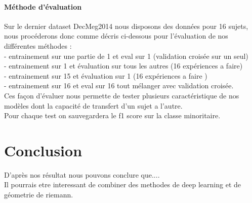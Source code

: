 \documentclass{article}
\begin{document}
\subsection{Méthode d'évaluation}
Sur le dernier dataset DecMeg2014 nous disposons des données pour 16 sujets, nous procéderons donc comme décris ci-dessous pour l'évaluation de nos différentes méthodes :\\
- entrainement sur une partie de 1 et eval sur 1 (validation croisée sur un seul)\\
- entrainement sur 1 et évaluation sur tous les autres (16 expériences a faire)\\
- entrainement sur 15 et évaluation sur 1 (16 expériences a faire )\\
- entrainement sur 16 et eval sur 16 tout mélanger avec validation croisée.
\\
Ces façon d'évaluer nous permette de tester plusieurs caractéristique de nos modèles dont la capacité de transfert d'un sujet a l'autre.
\\
Pour chaque test on sauvegardera le f1 score sur la classe minoritaire.

\part{Conclusion}
D'après nos résultat nous pouvons conclure que....
\\
Il pourrais etre interessant de combiner des methodes de deep learning et de géometrie de riemann.

 
\end{document}
